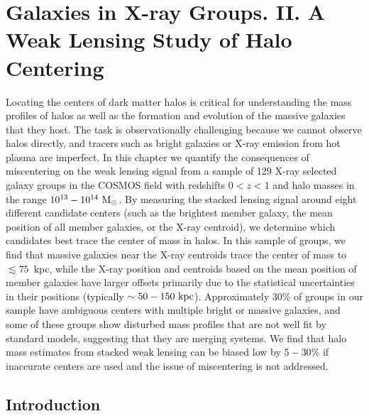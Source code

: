 \chapter{Galaxies in X-ray Groups. II. A Weak Lensing Study of Halo Centering}

\label{chap:centering}

  
  Locating the centers of dark matter halos is critical for
  understanding the mass profiles of halos as well as the formation and
  evolution of the massive galaxies that they host. The task is observationally
  challenging because we cannot observe halos directly, and tracers
  such as bright galaxies or X-ray emission from hot plasma are
  imperfect. In this chapter we quantify the consequences of miscentering on
  the weak lensing signal from a sample of 129 X-ray selected galaxy
  groups in the COSMOS field with redshifts $0<z<1$ and halo masses in
  the range $10^{13}-10^{14}~{\rm M_{\odot}}$. By measuring the
  stacked lensing signal around eight different candidate centers
  (such as the brightest member galaxy, the mean position of all
  member galaxies, or the X-ray centroid), we determine which
  candidates best trace the center of mass in halos. In this sample of
  groups, we find that massive galaxies near the X-ray centroids
  trace the center of mass to $\lesssim 75$~{\rm kpc}, while the X-ray 
  position and centroids based on the mean position of member galaxies
  have larger offsets primarily due to the statistical uncertainties in their
  positions (typically $\sim50-150~{\rm kpc}$). Approximately $30\%$ of
  groups in our sample have ambiguous centers with multiple bright or
  massive galaxies, and some of these groups show disturbed mass
  profiles that are not well fit by standard models, suggesting that
  they are merging systems. We find that halo mass estimates from stacked
  weak lensing can be biased low by $5-30\%$ if inaccurate centers are
  used and the issue of miscentering is not addressed. 

\section{Introduction}

